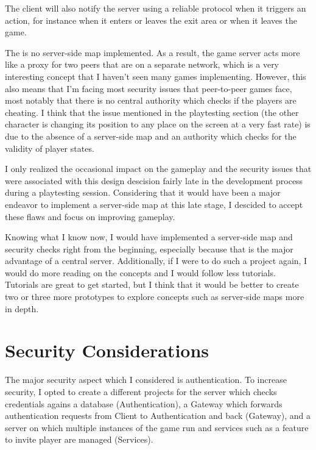 \documentclass{article}
\begin{document}
The client will also notify the server using a reliable protocol when it triggers an action, for instance when it enters or leaves the exit area or when it leaves the game.

The is no server-side map implemented. As a result, the game server acts more like a proxy for two peers that are on a separate network, which is a very interesting concept that I haven't seen many games implementing. However, this also means that I'm facing most security issues that peer-to-peer games face, most notably that there is no central authority which checks if the players are cheating. I think that the issue mentioned in the playtesting section (the other character is changing its position to any place on the screen at a very fast rate) is due to the absence of a server-side map and an authority which checks for the validity of player states. 

I only realized the occasional impact on the gameplay and the security issues that were associated with this design descision fairly late in the development process during a playtesting session. Considering that it would have been a major endeavor to implement a server-side map at this late stage, I descided to accept these flaws and focus on improving gameplay.

Knowing what I know now, I would have implemented a server-side map and security checks right from the beginning, especially because that is the major advantage of a central server. Additionally, if I were to do such a project again, I would do more reading on the concepts and I would follow less tutorials. Tutorials are great to get started, but I think that it would be better to create two or three more prototypes to explore concepts such as server-side maps more in depth.


\section{Security Considerations}
The major security aspect which I considered is authentication. To increase security, I opted to create a different projects for the server which checks credentials agains a database (Authentication), a Gateway which forwards authentication requests from Client to Authentication and back (Gateway), and a server on which multiple instances of the game run and services such as a feature to invite player are managed (Services).
\end{document}

